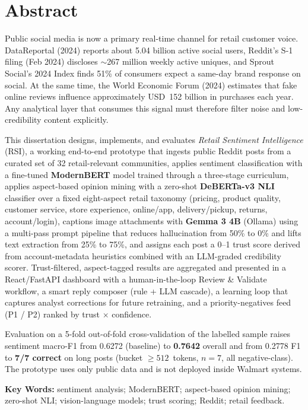 \chapter*{Abstract}

Public social media is now a primary real-time channel for retail customer
voice.  DataReportal (2024) reports about 5.04 billion active social users,
Reddit's S-1 filing (Feb 2024) discloses $\sim$267 million weekly active
uniques, and Sprout Social's 2024 Index finds 51\% of consumers expect a
same-day brand response on social.  At the same time, the World Economic
Forum (2024) estimates that fake online reviews influence approximately
USD~152 billion in purchases each year.  Any analytical layer that consumes
this signal must therefore filter noise and low-credibility content
explicitly.

This dissertation designs, implements, and evaluates \emph{Retail Sentiment
Intelligence} (RSI), a working end-to-end prototype that ingests public Reddit
posts from a curated set of 32 retail-relevant communities, applies sentiment
classification with a fine-tuned \textbf{ModernBERT} model trained through a
three-stage curriculum, applies aspect-based opinion mining with a zero-shot
\textbf{DeBERTa-v3 NLI} classifier over a fixed eight-aspect retail taxonomy
(pricing, product quality, customer service, store experience, online/app,
delivery/pickup, returns, account/login), captions image attachments with
\textbf{Gemma 3 4B} (Ollama) using a multi-pass prompt pipeline that reduces
hallucination from 50\% to 0\% and lifts text extraction from 25\% to 75\%,
and assigns each post a 0--1 trust score derived from account-metadata
heuristics combined with an LLM-graded credibility scorer.  Trust-filtered,
aspect-tagged results are aggregated and presented in a React/FastAPI
dashboard with a human-in-the-loop Review \& Validate workflow, a smart
reply composer (rule + LLM cascade), a learning loop that captures analyst
corrections for future retraining, and a priority-negatives feed (P1 / P2)
ranked by \textsf{trust $\times$ confidence}.

Evaluation on a 5-fold out-of-fold cross-validation of the labelled sample
raises sentiment macro-F1 from 0.6272 (baseline) to \textbf{0.7642} overall and
from 0.2778 F1 to \textbf{7/7 correct} on long posts (bucket $\ge 512$~tokens,
$n{=}7$, all negative-class).  The prototype uses only public
data and is not deployed inside Walmart systems.

\vspace{10pt}
\noindent\textbf{Key Words:} sentiment analysis; ModernBERT; aspect-based
opinion mining; zero-shot NLI; vision-language models; trust scoring; Reddit;
retail feedback.
\cleardoublepage
